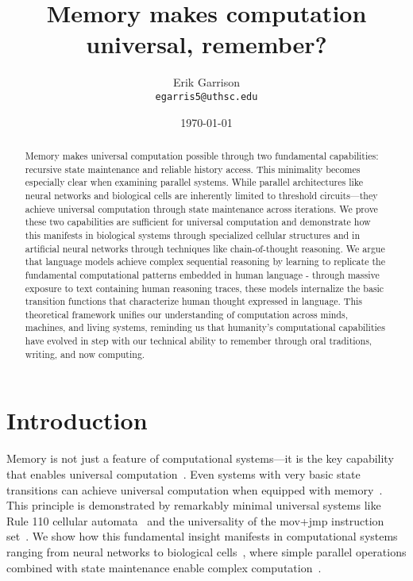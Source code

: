 \documentclass[12pt]{article}
\title{Memory makes computation universal, remember?}
\author{Erik Garrison\\
  \texttt{egarris5@uthsc.edu}\\[1ex]
  }
\date{\today}
\begin{document}
\maketitle

\begin{abstract}
Memory makes universal computation possible through two fundamental capabilities: recursive state maintenance and reliable history access.
This minimality becomes especially clear when examining parallel systems.
While parallel architectures like neural networks and biological cells are inherently limited to threshold circuits---they achieve universal computation through state maintenance across iterations.
We prove these two capabilities are sufficient for universal computation and demonstrate how this manifests in biological systems through specialized cellular structures and in artificial neural networks through techniques like chain-of-thought reasoning.
We argue that language models achieve complex sequential reasoning by learning to replicate the fundamental computational patterns embedded in human language - through massive exposure to text containing human reasoning traces, these models internalize the basic transition functions that characterize human thought expressed in language.
This theoretical framework unifies our understanding of computation across minds, machines, and living systems, reminding us that humanity's computational capabilities have evolved in step with our technical ability to remember through oral traditions, writing, and now computing.
\end{abstract}

\section{Introduction}
Memory is not just a feature of computational systems—it is the key capability that enables universal computation~\cite{turing1936computable}.
Even systems with very basic state transitions can achieve universal computation when equipped with memory~\cite{merrill2023parallelism,peng2024limitations}.
This principle is demonstrated by remarkably minimal universal systems like Rule 110 cellular automata~\cite{cook2004universality} and the universality of the mov+jmp instruction set~\cite{savage1994space}.
We show how this fundamental insight manifests in computational systems ranging from neural networks to biological cells~\cite{wang2023parallel}, where simple parallel operations combined with state maintenance enable complex computation~\cite{swamy1983space,bisaz2024memory}.
\end{document}
